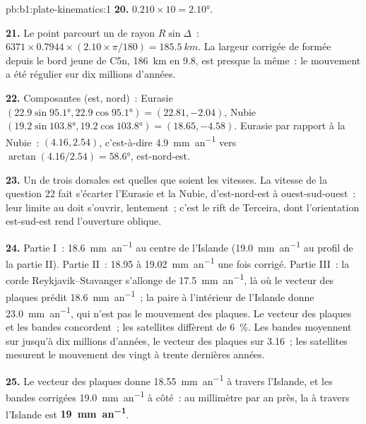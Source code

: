 \begin{solution}{pb:b1:plate-kinematics:1}
\textbf{20.} $0.210\times10 = \ang{2.10}$.

\textbf{21.} Le point parcourt un  de rayon $R\sin\Delta$~:
$6371\times0.7944\times(2.10\times\pi/180) = \qty{185.5}{km}$. La largeur
corrigée de  formée depuis le bord jeune de C5n, \qty{186}{km} en
\qty{9.8}{\Ma}, est presque la même~: le mouvement a été régulier sur dix
millions d'années.

\textbf{22.} Composantes (est, nord)~: Eurasie
$(22.9\sin\ang{95.1}, 22.9\cos\ang{95.1}) = (22.81, -2.04)$, Nubie
$(19.2\sin\ang{103.8}, 19.2\cos\ang{103.8}) = (18.65, -4.58)$. Eurasie par rapport
à la Nubie~: $(4.16, 2.54)$, c'est-à-dire \qty{4.9}{mm.an^{-1}} vers
$\arctan(4.16/2.54) = \ang{58.6}$, est-nord-est.

\textbf{23.} Un  de trois dorsales est  quelles que soient les vitesses. La
vitesse de la question 22 fait s'écarter l'Eurasie et la Nubie, d'est-nord-est à
ouest-sud-ouest~: leur limite au  doit s'ouvrir, lentement~; c'est le
rift de Terceira, dont l'orientation est-sud-est rend l'ouverture oblique.

\textbf{24.} Partie I~: \qty{18.6}{mm.an^{-1}} au centre de l'Islande
(\qty{19.0}{mm.an^{-1}} au profil de la partie II). Partie II~: 18.95 à
\qty{19.02}{mm.an^{-1}} une fois corrigé. Partie III~: la corde Reykjavik--Stavanger
s'allonge de \qty{17.5}{mm.an^{-1}}, là où le vecteur des plaques prédit
\qty{18.6}{mm.an^{-1}}~; la paire à l'intérieur de l'Islande donne \qty{23.0}{mm.an^{-1}},
qui n'est pas le mouvement des plaques. Le vecteur des plaques et les bandes concordent~; les
satellites diffèrent de \qty{6}{\percent}. Les bandes moyennent sur jusqu'à dix
millions d'années, le vecteur des plaques sur \qty{3.16}{\Ma}~; les satellites mesurent
le mouvement des vingt à trente dernières années.

\textbf{25.} Le vecteur des plaques donne \qty{18.55}{mm.an^{-1}} à travers l'Islande, et
les bandes corrigées \qty{19.0}{mm.an^{-1}} à côté~: au millimètre par an près, la  à travers l'Islande est
\textbf{\qty[text-series-to-math=true]{19}{mm.an^{-1}}}.
\end{solution}
